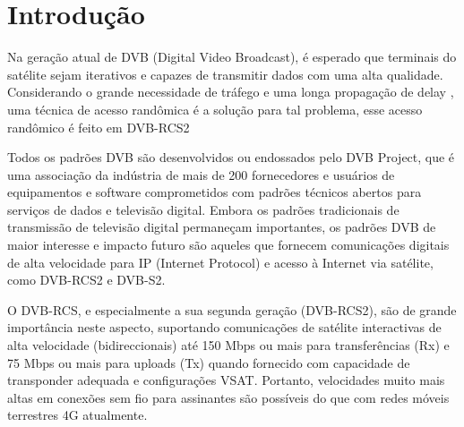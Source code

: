 \section{Introdução}\label{into}


Na geração atual de DVB (Digital Video Broadcast), é esperado que terminais do satélite sejam iterativos e capazes de transmitir dados com uma alta qualidade. Considerando o grande necessidade de tráfego e uma longa propagação de delay , uma técnica de acesso randômica é a solução para tal problema, esse acesso randômico é feito em DVB-RCS2 \cite{DBLP:journals/corr/MeloniM15c}

Todos os padrões DVB são desenvolvidos ou endossados pelo DVB Project, que é uma associação da indústria de mais de 200 fornecedores e usuários de equipamentos e software comprometidos com padrões técnicos abertos para serviços de dados e televisão digital. Embora os padrões tradicionais de transmissão de televisão digital permaneçam importantes, os padrões DVB de maior interesse e impacto futuro são aqueles que fornecem comunicações digitais de alta velocidade para IP (Internet Protocol) e acesso à Internet via satélite, como DVB-RCS2 e DVB-S2.

O DVB-RCS, e especialmente a sua segunda geração (DVB-RCS2), são de grande importância neste aspecto, suportando comunicações de satélite interactivas de alta velocidade (bidireccionais) até 150 Mbps ou mais para transferências (Rx) e 75 Mbps ou mais para uploads (Tx) quando fornecido com capacidade de transponder adequada e configurações VSAT. Portanto, velocidades muito mais altas em conexões sem fio para assinantes são possíveis do que com redes móveis terrestres 4G atualmente.
  
